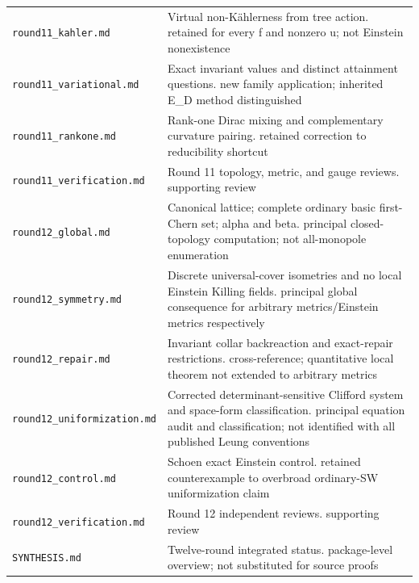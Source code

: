 \documentclass[UTF8,fontset=fandol,zihao=-4]{ctexart}
\theoremstyle{cn}
\begin{document}
\begin{longtable}{L{.34\textwidth}L{.59\textwidth}}
\nolinkurl{round11_kahler.md} & Virtual non-Kählerness from tree action. retained for every f and nonzero u; not Einstein nonexistence\\
\nolinkurl{round11_variational.md} & Exact invariant values and distinct attainment questions. new family application; inherited E\_D method distinguished\\
\nolinkurl{round11_rankone.md} & Rank-one Dirac mixing and complementary curvature pairing. retained correction to reducibility shortcut\\
\nolinkurl{round11_verification.md} & Round 11 topology, metric, and gauge reviews. supporting review\\
\nolinkurl{round12_global.md} & Canonical lattice; complete ordinary basic first-Chern set; alpha and beta. principal closed-topology computation; not all-monopole enumeration\\
\nolinkurl{round12_symmetry.md} & Discrete universal-cover isometries and no local Einstein Killing fields. principal global consequence for arbitrary metrics/Einstein metrics respectively\\
\nolinkurl{round12_repair.md} & Invariant collar backreaction and exact-repair restrictions. cross-reference; quantitative local theorem not extended to arbitrary metrics\\
\nolinkurl{round12_uniformization.md} & Corrected determinant-sensitive Clifford system and space-form classification. principal equation audit and classification; not identified with all published Leung conventions\\
\nolinkurl{round12_control.md} & Schoen exact Einstein control. retained counterexample to overbroad ordinary-SW uniformization claim\\
\nolinkurl{round12_verification.md} & Round 12 independent reviews. supporting review\\
\nolinkurl{SYNTHESIS.md} & Twelve-round integrated status. package-level overview; not substituted for source proofs\\
\bottomrule\end{longtable}\normalsize
\end{document}
